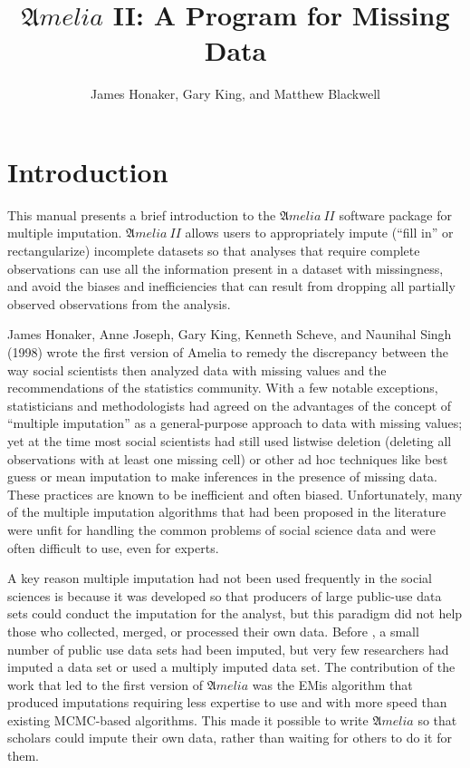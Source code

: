 \documentclass[12pt,titlepage]{article}
\title{${\mathfrak Amelia}$ II: A Program for Missing Data}
\author{James Honaker, Gary King, and Matthew Blackwell}
\newcommand{\Amelia}{\ensuremath{\mathfrak Amelia} }
\newcommand{\AmeliaII}{\ensuremath{\mathfrak Amelia~II} }
\begin{document}
\maketitle

\tableofcontents
\newpage



\section{Introduction}
\label{sec:intro}

This manual presents a brief introduction to the \AmeliaII software
package for multiple imputation.  \AmeliaII allows users to appropriately impute (``fill in'' or rectangularize) incomplete datasets so that analyses that require complete observations can use all the information present in a dataset with missingness, and avoid the biases and inefficiencies that can result from dropping all partially observed observations from the analysis.  


James Honaker, Anne Joseph, Gary King, Kenneth Scheve, and Naunihal Singh (1998) wrote the first version of
Amelia to remedy the discrepancy between the way social scientists
then analyzed data with missing values and the recommendations of the
statistics community.  With a few notable exceptions, statisticians
and methodologists had agreed on the advantages of the concept of
``multiple imputation'' as a general-purpose approach to data with
missing values; yet at the time most social scientists had still used
listwise deletion (deleting all observations with at least one missing
cell) or other ad hoc techniques like best guess or mean imputation to
make inferences in the presence of missing data.  These practices are
known to be inefficient and often biased.  Unfortunately, many of the
multiple imputation algorithms that had been proposed in the
literature were unfit for handling the common problems of social
science data and were often difficult to use, even for experts.

A key reason multiple imputation had not been used frequently in the
social sciences is because it was developed so that producers of large
public-use data sets could conduct the imputation for the analyst, but
this paradigm did not help those who collected, merged, or processed
their own data.  Before \citet*{KinHonJos01}, a small number of public
use data sets had been imputed, but very few researchers had imputed a
data set or used a multiply imputed data set.  The contribution of the
work that led to the first version of \Amelia was the EMis algorithm
that produced imputations requiring less expertise to use and with
more speed than existing MCMC-based algorithms.  This made it possible
to write \Amelia so that scholars could impute their own data, rather
than waiting for others to do it for them.
\end{document}
